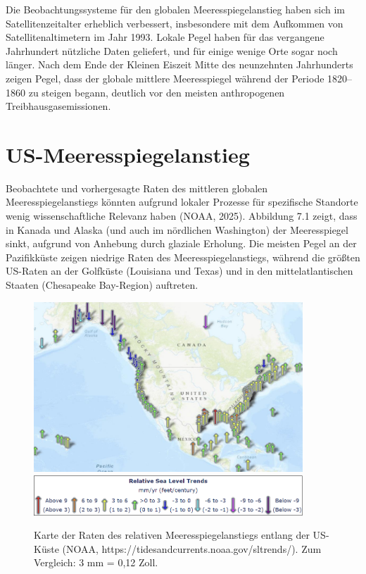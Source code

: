 \documentclass[12pt,paper=a4,DIV=12,parskip=never,chapterprefix=false,headings=standardclasses]{scrreprt}
\begin{document}
Die Beobachtungssysteme für den globalen Meeresspiegelanstieg haben sich im Satellitenzeitalter erheblich verbessert, insbesondere mit dem Aufkommen von Satellitenaltimetern im Jahr 1993. Lokale Pegel haben für das vergangene Jahrhundert nützliche Daten geliefert, und für einige wenige Orte sogar noch länger. Nach dem Ende der Kleinen Eiszeit Mitte des neunzehnten Jahrhunderts zeigen Pegel, dass der globale mittlere Meeresspiegel während der Periode 1820–1860 zu steigen begann, deutlich vor den meisten anthropogenen Treibhausgasemissionen.

\section{US-Meeresspiegelanstieg}
Beobachtete und vorhergesagte Raten des mittleren globalen Meeresspiegelanstiegs könnten aufgrund lokaler Prozesse für spezifische Standorte wenig wissenschaftliche Relevanz haben (NOAA, 2025). Abbildung 7.1 zeigt, dass in Kanada und Alaska (und auch im nördlichen Washington) der Meeresspiegel sinkt, aufgrund von Anhebung durch glaziale Erholung. Die meisten Pegel an der Pazifikküste zeigen niedrige Raten des Meeresspiegelanstiegs, während die größten US-Raten an der Golfküste (Louisiana und Texas) und in den mittelatlantischen Staaten (Chesapeake Bay-Region) auftreten.

\begin{figure}[H]
\begin{center}
\includegraphics[width=0.9\textwidth]{bilder/bilderKlima-0067.jpg}\\[1cm]
\includegraphics[width=0.9\textwidth]{bilder/bilderKlima-0068.png}\\[1cm]
\end{center}
\caption{Karte der Raten des relativen Meeresspiegelanstiegs entlang der US-Küste (NOAA, https://tidesandcurrents.noaa.gov/sltrends/). Zum Vergleich: 3 mm = 0,12 Zoll.}
\end{figure}
\end{document}
